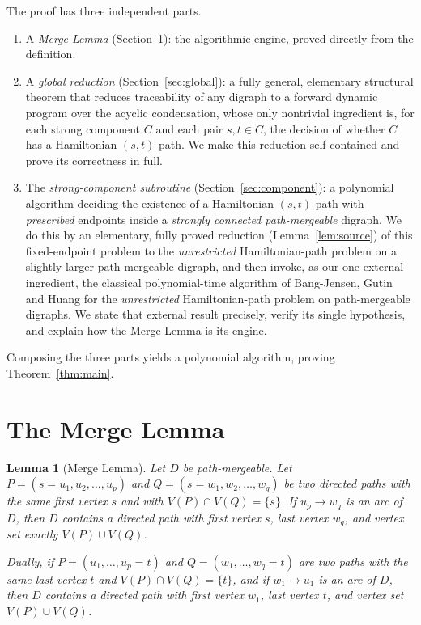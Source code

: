\documentclass[12pt]{article}
\newtheorem{lemma}{Lemma}
\theoremstyle{definition}
\begin{document}
The proof has three independent parts.
\begin{enumerate}
\item A \emph{Merge Lemma} (Section~\ref{sec:merge}): the algorithmic engine,
proved directly from the definition.
\item A \emph{global reduction} (Section~\ref{sec:global}): a fully general,
elementary structural theorem that reduces traceability of any digraph to a
forward dynamic program over the acyclic condensation, whose only nontrivial
ingredient is, for each strong component $C$ and each pair $s,t\in C$, the
decision of whether $C$ has a Hamiltonian $(s,t)$-path. We make this reduction
self-contained and prove its correctness in full.
\item The \emph{strong-component subroutine} (Section~\ref{sec:component}): a
polynomial algorithm deciding the existence of a Hamiltonian $(s,t)$-path with
\emph{prescribed} endpoints inside a \emph{strongly connected path-mergeable}
digraph. We do this by an elementary, fully proved reduction
(Lemma~\ref{lem:source}) of this fixed-endpoint problem to the \emph{unrestricted}
Hamiltonian-path problem on a slightly larger path-mergeable digraph, and then
invoke, as our one external ingredient, the classical polynomial-time algorithm of
Bang-Jensen, Gutin and Huang for the \emph{unrestricted} Hamiltonian-path problem
on path-mergeable digraphs. We state that external result precisely, verify its
single hypothesis, and explain how the Merge Lemma is its engine.
\end{enumerate}
Composing the three parts yields a polynomial algorithm, proving
Theorem~\ref{thm:main}.

\section{The Merge Lemma}\label{sec:merge}

\begin{lemma}[Merge Lemma]\label{lem:merge}
Let $D$ be path-mergeable. Let
$P=(s=u_{1},u_{2},\dots,u_{p})$ and $Q=(s=w_{1},w_{2},\dots,w_{q})$ be two directed
paths with the same first vertex $s$ and with $V(P)\cap V(Q)=\{s\}$. If
$u_{p}\to w_{q}$ is an arc of $D$, then $D$ contains a directed path with first
vertex $s$, last vertex $w_{q}$, and vertex set exactly $V(P)\cup V(Q)$.

Dually, if $P=(u_{1},\dots,u_{p}=t)$ and $Q=(w_{1},\dots,w_{q}=t)$ are two paths
with the same last vertex $t$ and $V(P)\cap V(Q)=\{t\}$, and if $w_{1}\to u_{1}$ is
an arc of $D$, then $D$ contains a directed path with first vertex $w_{1}$, last
vertex $t$, and vertex set $V(P)\cup V(Q)$.
\end{lemma}
\end{document}
